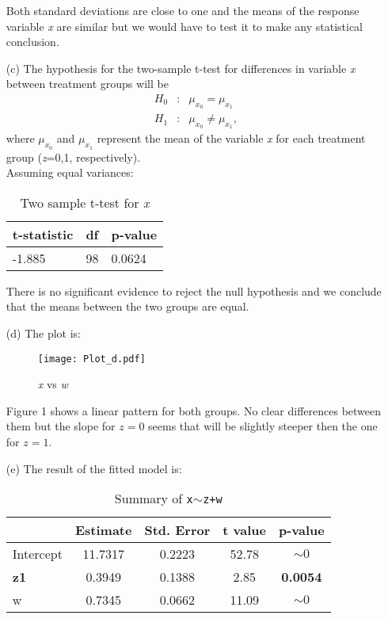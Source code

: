 \documentclass[11pt,a4paper]{article}
\begin{document}
\begin{enumerate}
Both standard deviations are close to one and the means of the response variable \emph{x} are similar but we would have to test it 
to make any statistical conclusion.

\item[(c)] The hypothesis for the two-sample t-test for differences in variable \emph{x} between treatment 
groups will be
\begin{eqnarray*}
  H_0 &:& \mu_{x_0} =\mu_{x_1}\\
  H_1 &:& \mu_{x_0} \neq \mu_{x_1},
\end{eqnarray*}
where $\mu_{x_0}$ and $\mu_{x_1}$ represent the mean of the variable \emph{x} for each treatment group (\emph{z}=0,1, respectively).\\
Assuming equal variances:

\begin{table}[h!]
\centering
\begin{tabular}{lll}
\hline
t-statistic & df & p-value\\
\hline
 -1.885 & 98 & 0.0624\\
\hline
\end{tabular}
\caption{Two sample t-test for \emph{x}}
\end{table}

There is no significant evidence to reject the null hypothesis and we conclude that the means between the two groups are equal. 

\newpage
\item[(d)] The plot is:

\begin{figure}[h!]
\centering
\texttt{[image: Plot\_d.pdf]}
\vspace{-0.6cm}
\caption{\emph{x} vs \emph{w}}
\end{figure}

Figure 1 shows a linear pattern for both groups. No clear differences between them but the slope for $z=0$ seems 
that will be slightly steeper then the one for $z=1$.

\item[(e)] The result of the fitted model is:

\begin{table}[h!]
\centering
\begin{tabular}{lcccc}
  \hline
 & Estimate & Std. Error & t value & p-value \\ 
  \hline
Intercept & 11.7317 & 0.2223 & 52.78 & $\sim 0$ \\ 
 \textbf{z1} & 0.3949 & 0.1388 & 2.85 & \textbf{0.0054} \\ 
  w & 0.7345 & 0.0662 & 11.09 & $\sim 0$ \\ 
   \hline
\end{tabular}
\caption{Summary of \texttt{x$\sim$z+w} }
\end{table}


\end{enumerate}
\end{document}
